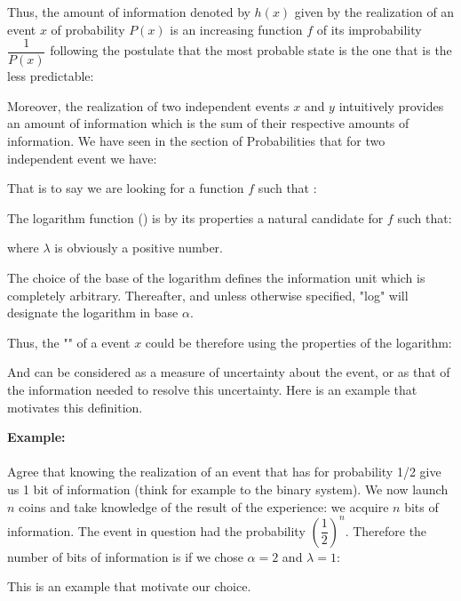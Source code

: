 	Thus, the amount of information denoted by $h(x)$ given by the realization of an event $x$ of probability $P(x)$ is an increasing function $f$ of its improbability $\dfrac{1}{P(x)}$ following the postulate that the most probable state is the one that is the less predictable:
	
	Moreover, the realization of two independent events $x$ and $y$ intuitively provides an amount of information which is the sum of their respective amounts of information. We have seen in the section of Probabilities that for two independent event we have:
	
	
	That is to say we are looking for a function $f$ such that :
	
	The logarithm function () is by its properties a natural candidate for $f$ such that:
	
	where $\lambda$ is obviously a positive number.
	
	\begin{tcolorbox}[title=Remark,colframe=black,arc=10pt]
The choice of the base of the logarithm defines the information unit which is completely arbitrary. Thereafter, and unless otherwise specified, "log" will designate the logarithm in base $\alpha$.
	\end{tcolorbox}
	
	Thus, the "" of a event $x$ could be therefore using the properties of the logarithm:
		
	And can be considered as a measure of uncertainty about the event, or as that of the information needed to resolve this uncertainty. Here is an example that motivates this definition.
	\begin{tcolorbox}[colframe=black,colback=white,sharp corners]
\textbf{{\Large {}}Example:}\\\\
	Agree that knowing the realization of an event that has for probability 1/2 give us 1 bit of information (think for example to the binary system). We now launch $n$ coins and take knowledge of the result of the experience: we acquire $n$ bits of information. The event in question had the probability $\left(\dfrac{1}{2}\right)^n$. Therefore the number of bits of information is if we chose $\alpha=2$ and $\lambda=1$:
	
	This is an example that motivate our choice.
	\end{tcolorbox}
	
